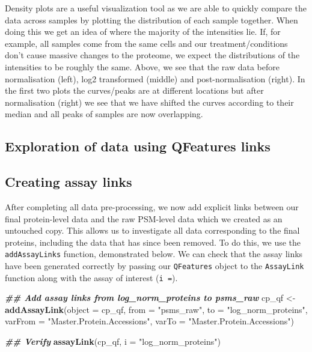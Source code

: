 \documentclass[9pt,a4paper,]{extarticle}
\newenvironment{Shaded}{\begin{snugshade}}{\end{snugshade}}
\newcommand{\AttributeTok}[1]{\textcolor[rgb]{0.13,0.29,0.53}{#1}}
\newcommand{\DocumentationTok}[1]{\textcolor[rgb]{0.56,0.35,0.01}{\textbf{\textit{#1}}}}
\newcommand{\FunctionTok}[1]{\textcolor[rgb]{0.13,0.29,0.53}{\textbf{#1}}}
\newcommand{\NormalTok}[1]{#1}
\newcommand{\OtherTok}[1]{\textcolor[rgb]{0.56,0.35,0.01}{#1}}
\newcommand{\StringTok}[1]{\textcolor[rgb]{0.31,0.60,0.02}{#1}}
\begin{document}
Density plots are a useful visualization tool as we are able to quickly compare
the data across samples by plotting the distribution of each sample together.
When doing this we get an idea of where the majority of the intensities lie. If,
for example, all samples come from the same cells and our treatment/conditions
don't cause massive changes to the proteome, we expect the distributions of the
intensities to be roughly the same. Above, we see that the raw data before
normalisation (left), log2 transformed (middle) and post-normalisation (right).
In the first two plots the curves/peaks are at different locations but after
normalisation (right) we see that we have shifted the curves according to their
median and all peaks of samples are now overlapping.

\subsection{Exploration of data using QFeatures links}\label{exploration-of-data-using-qfeatures-links}

\subsection{Creating assay links}\label{creating-assay-links}

After completing all data pre-processing, we now add explicit links between our
final protein-level data and the raw PSM-level data which we created as an
untouched copy. This allows us to investigate all data corresponding to the
final proteins, including the data that has since been removed. To do this, we
use the \texttt{addAssayLinks} function, demonstrated below. We can check that the
assay links have been generated correctly by passing our \texttt{QFeatures} object to
the \texttt{AssayLink} function along with the assay of interest (\texttt{i\ =}).

\begin{Shaded}
\begin{Highlighting}[]
\DocumentationTok{\#\# Add assay links from log\_norm\_proteins to psms\_raw}
\NormalTok{cp\_qf }\OtherTok{\textless{}{-}} \FunctionTok{addAssayLink}\NormalTok{(}\AttributeTok{object =}\NormalTok{ cp\_qf, }
                      \AttributeTok{from =} \StringTok{"psms\_raw"}\NormalTok{,}
                      \AttributeTok{to =} \StringTok{"log\_norm\_proteins"}\NormalTok{,}
                      \AttributeTok{varFrom =} \StringTok{"Master.Protein.Accessions"}\NormalTok{,}
                      \AttributeTok{varTo =} \StringTok{"Master.Protein.Accessions"}\NormalTok{)}

\DocumentationTok{\#\# Verify}
\FunctionTok{assayLink}\NormalTok{(cp\_qf, }
          \AttributeTok{i =} \StringTok{"log\_norm\_proteins"}\NormalTok{)}
\end{Highlighting}
\end{Shaded}
\end{document}

